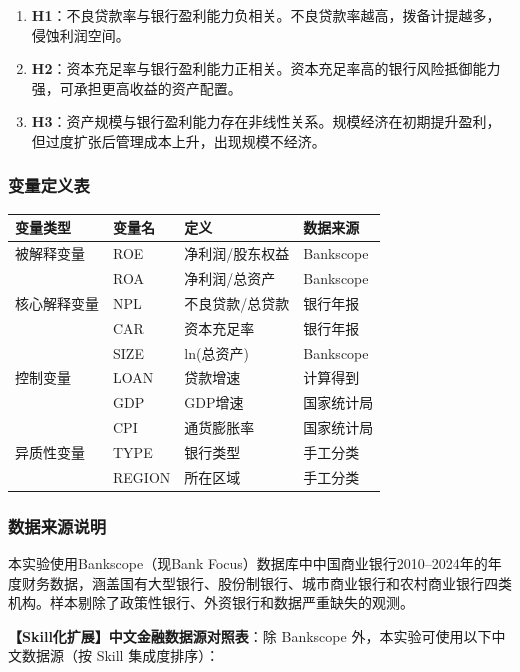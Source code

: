 \begin{enumerate}[leftmargin=2em]
  \item \textbf{H1}：不良贷款率与银行盈利能力负相关。不良贷款率越高，拨备计提越多，侵蚀利润空间。
  \item \textbf{H2}：资本充足率与银行盈利能力正相关。资本充足率高的银行风险抵御能力强，可承担更高收益的资产配置。
  \item \textbf{H3}：资产规模与银行盈利能力存在非线性关系。规模经济在初期提升盈利，但过度扩张后管理成本上升，出现规模不经济。
\end{enumerate}

\subsubsection{变量定义表}

\begin{table}[H]
\centering
\begin{tabular}{llll}
\toprule
\textbf{变量类型} & \textbf{变量名} & \textbf{定义} & \textbf{数据来源} \\
\midrule
被解释变量 & ROE & 净利润/股东权益 & Bankscope \\
 & ROA & 净利润/总资产 & Bankscope \\
\midrule
核心解释变量 & NPL & 不良贷款/总贷款 & 银行年报 \\
 & CAR & 资本充足率 & 银行年报 \\
 & SIZE & ln(总资产) & Bankscope \\
\midrule
控制变量 & LOAN & 贷款增速 & 计算得到 \\
 & GDP & GDP增速 & 国家统计局 \\
 & CPI & 通货膨胀率 & 国家统计局 \\
\midrule
异质性变量 & TYPE & 银行类型 & 手工分类 \\
 & REGION & 所在区域 & 手工分类 \\
\bottomrule
\end{tabular}
\end{table}

\subsubsection{数据来源说明}

本实验使用Bankscope（现Bank Focus）数据库中中国商业银行2010--2024年的年度财务数据，涵盖国有大型银行、股份制银行、城市商业银行和农村商业银行四类机构。样本剔除了政策性银行、外资银行和数据严重缺失的观测。

\textbf{【Skill化扩展】中文金融数据源对照表}：除 Bankscope 外，本实验可使用以下中文数据源（按 Skill 集成度排序）：

